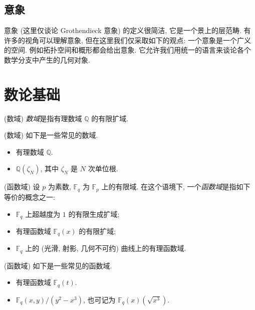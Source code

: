 \documentclass{book}
\begin{document}
	\section{意象}
	
	意象 (这里仅谈论 Grothendieck 意象) 的定义很简洁, 它是一个景上的层范畴. 有许多的视角可以理解意象, 但在这里我们仅采取如下的观点: 一个意象是一个广义的空间. 例如拓扑空间和概形都会给出意象. 它允许我们用统一的语言来谈论各个数学分支中产生的几何对象.
	
	
	\chapter{数论基础}
	
	\begin{definition}
		{(数域)}
		\emph{数域}是指有理数域 $\mathbb{Q}$ 的有限扩域.
	\end{definition}
	
	\begin{example}
		{(数域)}
		如下是一些常见的数域.
		\begin{itemize}
			\item 有理数域 $\mathbb Q$.
			\item $\mathbb Q(\zeta_N)$, 其中 $\zeta_N$ 是 $N$ 次单位根.
		\end{itemize}
	\end{example}
	
	\begin{definition}
		{(函数域)}
		设 $p$ 为素数, $\mathbb F_q$ 为 $\mathbb F_p$ 上的有限域. 在这个语境下, 一个\emph{函数域}是指如下等价的概念之一:
		\begin{itemize}
			\item $\mathbb F_q$ 上超越度为 $1$ 的有限生成扩域;
			\item 有理函数域 $\mathbb F_q(x)$ 的有限扩域;
			\item $\mathbb F_q$ 上的 (光滑, 射影, 几何不可约) 曲线上的有理函数域.
		\end{itemize}
	\end{definition}
	
	\begin{example}
		{(函数域)}
		如下是一些常见的函数域.
		\begin{itemize}
			\item 有理函数域 $\mathbb F_q(t)$.
			\item $\mathbb F_q(x,y)/(y^2-x^3)$, 也可记为 $\mathbb F_q(x)(\sqrt{x^3})$.
		\end{itemize}
	\end{example}
	
\end{document}
